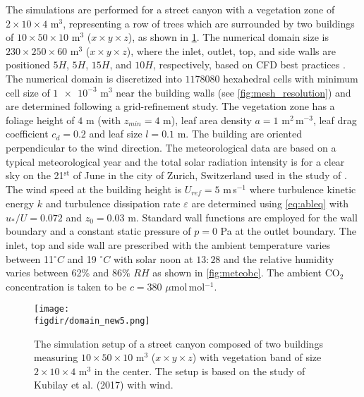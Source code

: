 The simulations are performed for a street canyon with a vegetation zone of $2 \times 10 \times 4$ m$^3$, representing a row of trees which are surrounded by two buildings of $10 \times 50 \times 10$ m$^3$ ($x\times y \times z$), as shown in \cref{fig:domain_new5}. The numerical domain size is $230\times 250 \times 60$ m$^3$  ($x\times y \times z$), where the inlet, outlet, top, and side walls are positioned $5 H$, $5 H$, $15 H$, and $10 H$, respectively, based on CFD best practices \citep{Blocken2015, Franke2007, Tominaga2008}. The numerical domain is discretized into $\num{1178080}$ hexahedral cells with minimum cell size of $\num{1e-3}$ m$^{3}$ near the building walls (see \cref{fig:mesh_resolution}) and are determined following a grid-refinement study. The vegetation zone has a foliage height of $4$ m (with $z_{\textit{min}}= 4$ m), leaf area density $a= 1$ m$^2$\,m$^{-3}$, leaf drag coefficient $c_d=0.2$ and leaf size $l=0.1$ m. The building are oriented perpendicular to the wind direction. The meteorological data are based on a typical meteorological year and the total solar radiation intensity is for a clear sky on the 21$^{\mathrm{st}}$ of June in the city of Zurich, Switzerland used in the study of \cite{Kubilay2018}. The wind speed at the building height is $U_{\textit{ref}}=5$ m\,s$^{-1}$ where turbulence kinetic energy $k$ and turbulence dissipation rate $\varepsilon$ are determined using \cref{eq:ableq} \citep{Richards1993} with $u_*/U = 0.072$ and $z_0 = 0.03$ m. Standard wall functions are employed for the wall boundary and a constant static pressure of $p=0$ Pa at the outlet boundary. The inlet, top and side wall are prescribed with the ambient temperature varies between 11$^{\circ}C$ and 19 $^{\circ}C$ with solar noon at $13:28$ and the relative humidity varies between 62\% and 86\% $RH$ as shown in \cref{fig:meteobc}. The ambient CO$_2$ concentration is taken to be $c=380$ $\mu$mol\,mol$^{-1}$. 

	\begin{figure}[t]
	\centering
	\texttt{[image: \\figdir/domain\_new5.png]}
	\caption{The simulation setup of a street canyon composed of two buildings measuring $10 \times 50 \times 10$ m$^3$ ($x\times y \times z$) with vegetation band of size $2 \times 10 \times 4$ m$^3$ in the center. The setup is based on the study of Kubilay et al. (2017) with wind.}
	\label{fig:domain_new5}
	\end{figure}


